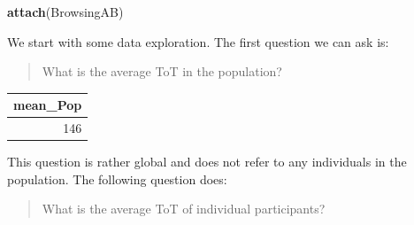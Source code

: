 \documentclass[]{svmono}
\newenvironment{Shaded}{\begin{snugshade}}{\end{snugshade}}
\newcommand{\KeywordTok}[1]{\textcolor[rgb]{0.13,0.29,0.53}{\textbf{#1}}}
\newcommand{\DataTypeTok}[1]{\textcolor[rgb]{0.13,0.29,0.53}{#1}}
\newcommand{\DecValTok}[1]{\textcolor[rgb]{0.00,0.00,0.81}{#1}}
\newcommand{\StringTok}[1]{\textcolor[rgb]{0.31,0.60,0.02}{#1}}
\newcommand{\OperatorTok}[1]{\textcolor[rgb]{0.81,0.36,0.00}{\textbf{#1}}}
\newcommand{\NormalTok}[1]{#1}
\begin{document}
\begin{Shaded}
\begin{Highlighting}[]
\KeywordTok{attach}\NormalTok{(BrowsingAB)}
\end{Highlighting}
\end{Shaded}

\begin{Shaded}
\end{Shaded}

We start with some data exploration. The first question we can ask is:

\begin{quote}
What is the average ToT in the population?
\end{quote}

\begin{Shaded}
\end{Shaded}

\begin{tabular}{r}
\hline
mean\_Pop\\
\hline
146\\
\hline
\end{tabular}

This question is rather global and does not refer to any individuals in
the population. The following question does:

\begin{quote}
What is the average ToT of individual participants?
\end{quote}

\begin{Shaded}
\end{Shaded}
\end{document}
